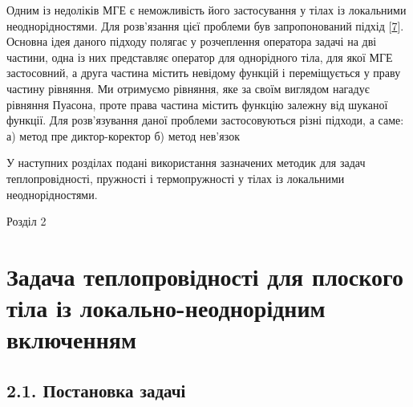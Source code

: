 Одним із недоліків МГЕ є неможливість його застосування у тілах із
локальними неоднорідностями. Для розв'язання цієї проблеми був
запропонований підхід {[}\protect\hyperlink{anchor-5}{7}{]}. Основна
ідея даного підходу полягає у розчеплення оператора задачі на дві
частини, одна із них представляє оператор для однорідного тіла, для якої
МГЕ застосовний, а друга частина містить невідому функцій і
переміщується у праву частину рівняння. Ми отримуємо рівняння, яке за
своїм виглядом нагадує рівняння Пуасона, проте права частина містить
функцію залежну від шуканої функції. Для розв'язування даної проблеми
застосовуються різні підходи, а саме: а) метод пре диктор-коректор б)
метод нев'язок

У наступних розділах подані використання зазначених методик для задач
теплопровідності, пружності і термопружності у тілах із локальними
неоднорідностями.

Розділ 2

\hypertarget{ux437ux430ux434ux430ux447ux430-ux442ux435ux43fux43bux43eux43fux440ux43eux432ux456ux434ux43dux43eux441ux442ux456-ux434ux43bux44f-ux43fux43bux43eux441ux43aux43eux433ux43e-ux442ux456ux43bux430-ux456ux437-ux43bux43eux43aux430ux43bux44cux43dux43e-ux43dux435ux43eux434ux43dux43eux440ux456ux434ux43dux438ux43c-ux432ux43aux43bux44eux447ux435ux43dux43dux44fux43c}{%
\section[Задача теплопровідності для плоского тіла із
локально-неоднорідним
включенням]{\texorpdfstring{\protect\hypertarget{anchor-28}{}{}Задача
теплопровідності для плоского тіла із локально-неоднорідним
включенням}{Задача теплопровідності для плоского тіла із локально-неоднорідним включенням}}\label{ux437ux430ux434ux430ux447ux430-ux442ux435ux43fux43bux43eux43fux440ux43eux432ux456ux434ux43dux43eux441ux442ux456-ux434ux43bux44f-ux43fux43bux43eux441ux43aux43eux433ux43e-ux442ux456ux43bux430-ux456ux437-ux43bux43eux43aux430ux43bux44cux43dux43e-ux43dux435ux43eux434ux43dux43eux440ux456ux434ux43dux438ux43c-ux432ux43aux43bux44eux447ux435ux43dux43dux44fux43c}}

\hypertarget{ux43fux43eux441ux442ux430ux43dux43eux432ux43aux430-ux437ux430ux434ux430ux447ux456}{%
\subsection[2.1. Постановка
задачі]{\texorpdfstring{\protect\hypertarget{anchor-29}{}{}2.1.
Постановка
задачі}{2.1. Постановка задачі}}\label{ux43fux43eux441ux442ux430ux43dux43eux432ux43aux430-ux437ux430ux434ux430ux447ux456}}


